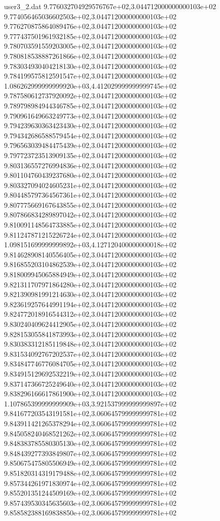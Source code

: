 \begin{filecontents}{user3_2.dat}
9.776032704929576767e+02,3.044712000000000103e+02
9.774056465036602503e+02,3.044712000000000103e+02
9.776270875864089476e+02,3.044712000000000103e+02
9.777437501961932185e+02,3.044712000000000103e+02
9.780703591559203005e+02,3.044712000000000103e+02
9.780818538887261866e+02,3.044712000000000103e+02
9.783034930404218130e+02,3.044712000000000103e+02
9.784199575812591547e+02,3.044712000000000103e+02
1.086262999999999920e+03,4.412029999999999745e+02
9.787580612737920092e+02,3.044712000000000103e+02
9.789798984944346785e+02,3.044712000000000103e+02
9.790961649663249773e+02,3.044712000000000103e+02
9.794239630363423430e+02,3.044712000000000103e+02
9.794342686588579454e+02,3.044712000000000103e+02
9.796563039484475439e+02,3.044712000000000103e+02
9.797723723513909135e+02,3.044712000000000103e+02
9.803136557276994836e+02,3.044712000000000103e+02
9.801104760439237680e+02,3.044712000000000103e+02
9.803327094024605231e+02,3.044712000000000103e+02
9.804485797364567361e+02,3.044712000000000103e+02
9.807775669167643855e+02,3.044712000000000103e+02
9.807866834289897042e+02,3.044712000000000103e+02
9.810091148564733885e+02,3.044712000000000103e+02
9.811247871215226724e+02,3.044712000000000103e+02
1.098151699999999892e+03,4.127120400000000018e+02
9.814628908140556405e+02,3.044712000000000103e+02
9.816855203104862539e+02,3.044712000000000103e+02
9.818009945065884949e+02,3.044712000000000103e+02
9.821311707971864280e+02,3.044712000000000103e+02
9.821390981991214630e+02,3.044712000000000103e+02
9.823619257644991194e+02,3.044712000000000103e+02
9.824772018916544312e+02,3.044712000000000103e+02
9.830240409624412905e+02,3.044712000000000103e+02
9.828153055841873993e+02,3.044712000000000103e+02
9.830383312185119848e+02,3.044712000000000103e+02
9.831534092767202537e+02,3.044712000000000103e+02
9.834847746776084705e+02,3.044712000000000103e+02
9.834915129692532219e+02,3.044712000000000103e+02
9.837147366725249640e+02,3.044712000000000103e+02
9.838296166617861900e+02,3.044712000000000103e+02
1.107865399999999909e+03,3.921537999999999897e+02
9.841677203543191581e+02,3.060645799999999781e+02
9.843911421265378294e+02,3.060645799999999781e+02
9.845058240468521262e+02,3.060645799999999781e+02
9.848383785580305130e+02,3.060645799999999781e+02
9.848439277393849807e+02,3.060645799999999781e+02
9.850675475805506949e+02,3.060645799999999781e+02
9.851820314319179488e+02,3.060645799999999781e+02
9.857344261971830974e+02,3.060645799999999781e+02
9.855201351244509169e+02,3.060645799999999781e+02
9.857439530345635603e+02,3.060645799999999781e+02
9.858582388169838850e+02,3.060645799999999781e+02

\end{filecontents}
